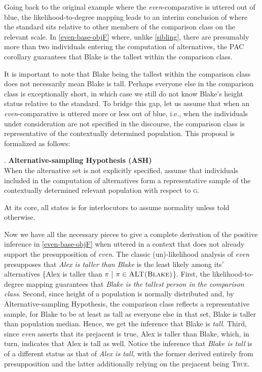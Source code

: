\documentclass[12pt,letterpaper]{scrartcl}
\begin{document}
Going back to the original example where the \textit{even}-comparative is uttered out of blue, the likelihood-to-degree mapping leads to an interim conclusion of where the standard sits relative to other members of the comparison class on the relevant scale.  In \ref{even-base-objF} where, unlike \ref{sibling}, there are presumably more than two individuals entering the computation of alternatives, the PAC corollary guarantees that Blake is the tallest within the comparison class. 

It is important to note that Blake being the tallest within the comparison class does not necessarily mean Blake is tall. Perhaps everyone else in the comparison class is exceptionally short, in which case we still do not know Blake's height status relative to the standard. To bridge this gap, let us assume that when an \textit{even}-comparative is uttered more or less out of blue, i.e., when the individuals under consideration are not specified in the discourse, the comparison class is representative of the contextually determined population. This proposal is formalized as follows:

\ex. \textbf{Alternative-sampling Hypothesis (ASH)} \\ When the alternative set is not explicitly specified, assume that individuals included in the computation of alternatives form a representative sample of the contextually determined relevant population with respect to \textsc{g}.

At its core, all \Last states is for interlocutors to assume normality unless told otherwise.

Now we have all the necessary pieces to give a complete derivation of the positive inference in \ref{even-base-objF} when uttered in a context that does not already support the presupposition of \textit{even}. The classic (un)-likelihood analysis of \textit{even} presupposes that \textit{Alex is taller than Blake} is the least likely among its' alternatives \{Alex is taller than $\pi$ | $\pi \in \textsc{ALT(Blake)}$\}. First, the likelihood-to-degree mapping guarantees that \textit{Blake is the tallest person in the comparison class}. Second, since height of a population is normally distributed and, by Alternative-sampling Hypothesis, the comparison class reflects a representative sample, for Blake to be at least as tall as everyone else in that set, Blake is taller than population median. Hence, we get the inference that Blake is \textit{tall}. Third, since \textit{even} asserts that its prejacent is true, Alex is taller than Blake, which, in turn, indicates that Alex is tall as well. Notice the inference that \textit{Blake is tall} is of a different status as that of \textit{Alex is tall}, with the former derived entirely from presupposition and the latter additionally relying on the prejacent being \textsc{True}.
\end{document}
